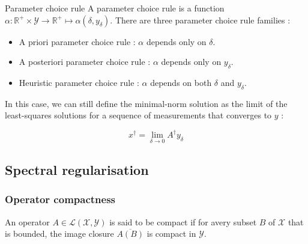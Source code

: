 \begin{definition}{Parameter choice rule}
    A parameter choice rule is a function $\alpha: \mathbb{R}^+ \times \mathcal{Y} \to \mathbb{R}^+ \mapsto \alpha(\delta, y_\delta)$.
    There are three parameter choice rule families :
    \begin{itemize}
        \item A priori parameter choice rule : $\alpha$ depends only on $\delta$.
        \item A posteriori parameter choice rule : $\alpha$ depends only on $y_\delta$.
        \item Heuristic parameter choice rule : $\alpha$ depends on both $\delta$ and $y_\delta$.
    \end{itemize}
\end{definition}


In this case, we can still define the minimal-norm solution as the limit of the least-squares solutions for a sequence of measurements that converges to $y$ :

\begin{equation*}
    x^\dagger = \lim_{\delta \to 0} A^\dagger y_\delta
\end{equation*}

\subsection{Spectral regularisation}

\subsubsection{Operator compactness}

\begin{definition}
    An operator $A \in \mathcal{L}(\mathcal{X}, \mathcal{Y})$ is said to be compact if for avery subset $B$ of $\mathcal{X}$ that is bounded, the image closure $\overline{A(B)}$ is compact in $\mathcal{Y}$.
\end{definition}


